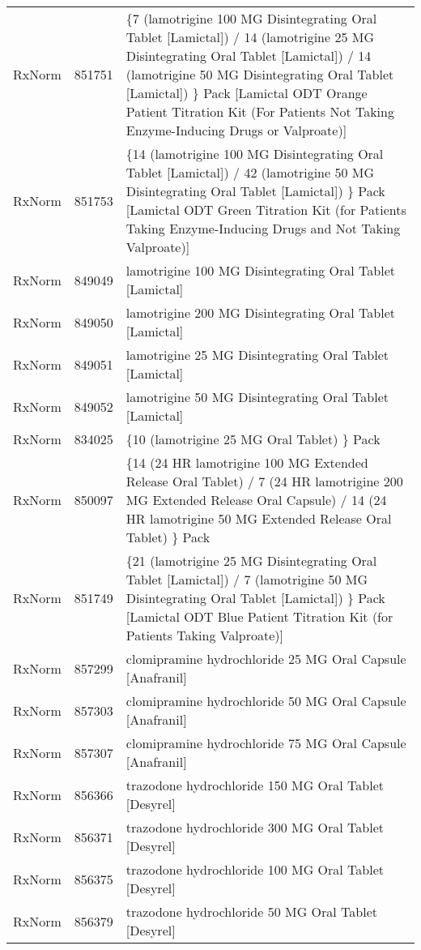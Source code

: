 \begin{longtable}{p{}p{}p{}}
  RxNorm & 851751 & \{7 (lamotrigine 100 MG Disintegrating Oral Tablet [Lamictal]) / 14 (lamotrigine 25 MG Disintegrating Oral Tablet [Lamictal]) / 14 (lamotrigine 50 MG Disintegrating Oral Tablet [Lamictal]) \} Pack [Lamictal ODT Orange Patient Titration Kit (For Patients Not Taking Enzyme-Inducing Drugs or Valproate)] \\ 
  RxNorm & 851753 & \{14 (lamotrigine 100 MG Disintegrating Oral Tablet [Lamictal]) / 42 (lamotrigine 50 MG Disintegrating Oral Tablet [Lamictal]) \} Pack [Lamictal ODT Green Titration Kit (for Patients Taking Enzyme-Inducing Drugs and Not Taking Valproate)] \\ 
  RxNorm & 849049 & lamotrigine 100 MG Disintegrating Oral Tablet [Lamictal] \\ 
  RxNorm & 849050 & lamotrigine 200 MG Disintegrating Oral Tablet [Lamictal] \\ 
  RxNorm & 849051 & lamotrigine 25 MG Disintegrating Oral Tablet [Lamictal] \\ 
  RxNorm & 849052 & lamotrigine 50 MG Disintegrating Oral Tablet [Lamictal] \\ 
  RxNorm & 834025 & \{10 (lamotrigine 25 MG Oral Tablet) \} Pack \\ 
  RxNorm & 850097 & \{14 (24 HR lamotrigine 100 MG Extended Release Oral Tablet) / 7 (24 HR lamotrigine 200 MG Extended Release Oral Capsule) / 14 (24 HR lamotrigine 50 MG Extended Release Oral Tablet) \} Pack \\ 
  RxNorm & 851749 & \{21 (lamotrigine 25 MG Disintegrating Oral Tablet [Lamictal]) / 7 (lamotrigine 50 MG Disintegrating Oral Tablet [Lamictal]) \} Pack [Lamictal ODT Blue Patient Titration Kit (for Patients Taking Valproate)] \\ 
  RxNorm & 857299 & clomipramine hydrochloride 25 MG Oral Capsule [Anafranil] \\ 
  RxNorm & 857303 & clomipramine hydrochloride 50 MG Oral Capsule [Anafranil] \\ 
  RxNorm & 857307 & clomipramine hydrochloride 75 MG Oral Capsule [Anafranil] \\ 
  RxNorm & 856366 & trazodone hydrochloride 150 MG Oral Tablet [Desyrel] \\ 
  RxNorm & 856371 & trazodone hydrochloride 300 MG Oral Tablet [Desyrel] \\ 
  RxNorm & 856375 & trazodone hydrochloride 100 MG Oral Tablet [Desyrel] \\ 
  RxNorm & 856379 & trazodone hydrochloride 50 MG Oral Tablet [Desyrel] \\ 

\end{longtable}
